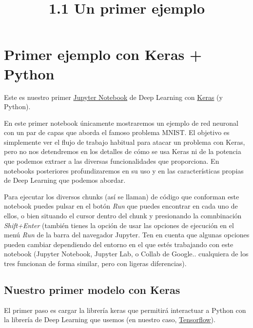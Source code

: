 \documentclass[11pt]{article}
\title{1.1 Un primer ejemplo}
\begin{document}
    
    
    \maketitle
    
    

    
    \hypertarget{primer-ejemplo-con-keras-python}{%
\section{Primer ejemplo con Keras +
Python}\label{primer-ejemplo-con-keras-python}}

Este es nuestro primer \href{http://jupyter.org}{Jupyter Notebook} de
Deep Learning con \href{https://keras.io}{Keras} (y Python).

En este primer notebook únicamente mostraremos un ejemplo de red
neuronal con un par de capas que aborda el famoso problema MNIST. El
objetivo es simplemente ver el flujo de trabajo habitual para atacar un
problema con Keras, pero no nos detendremos en los detalles de cómo se
usa Keras ni de la potencia que podemos extraer a las diversas
funcionalidades que proporciona. En notebooks posteriores
profundizaremos en su uso y en las características propias de Deep
Learning que podemos abordar.

Para ejecutar los diversos chunks (así se llaman) de código que
conforman este notebook puedes pulsar en el botón \emph{Run} que puedes
encontrar en cada uno de ellos, o bien situando el cursor dentro del
chunk y presionando la comnbinación \emph{Shift+Enter} (también tienes
la opción de usar las opciones de ejecución en el menú \emph{Run} de la
barra del navegador Jupyter. Ten en cuenta que algunas opciones pueden
cambiar dependiendo del entorno en el que estés trabajando con este
notebook (Jupyter Notebook, Jupyter Lab, o Collab de Google.. cualquiera
de los tres funcionan de forma similar, pero con ligeras diferencias).

    \hypertarget{nuestro-primer-modelo-con-keras}{%
\subsection{Nuestro primer modelo con
Keras}\label{nuestro-primer-modelo-con-keras}}

El primer paso es cargar la librería keras que permitirá interactuar a
Python con la librería de Deep Learning que usemos (en nuestro caso,
\href{https://www.tensorflow.org}{Tensorflow}).
\end{document}
